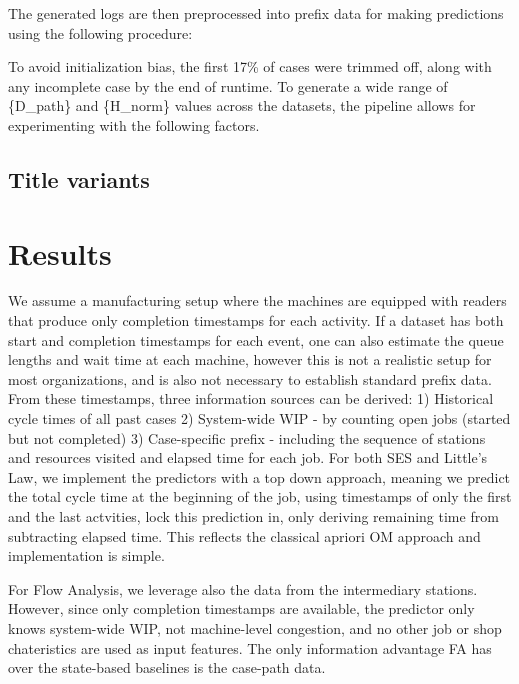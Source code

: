 \documentclass[
]{ceurart}
\begin{document}
The generated logs are then preprocessed into prefix data for making predictions using the following procedure:

To avoid initialization bias, the first 17\% of cases were trimmed off, along with any incomplete case by the end of runtime. 
To generate a wide range of \{D\_path\} and \{H\_norm\} values across the datasets, the pipeline allows for experimenting with the following factors.




\subsection{Title variants}

\section{Results}

We assume a manufacturing setup where the machines are equipped with readers that produce only completion timestamps for each activity. If a dataset has both start and completion 
timestamps for each event, one can also estimate the queue lengths and wait time at each machine, however this is not a realistic setup for most organizations, and is also not necessary to establish standard prefix data.
From these timestamps, three information sources can be derived:
1) Historical cycle times of all past cases
2) System-wide WIP - by counting open jobs (started but not completed)
3) Case-specific prefix - including the sequence of stations and resources visited and elapsed time for each job.
For both SES and Little's Law, we implement the predictors with a top down approach, meaning we predict the total cycle time at the beginning of the job, 
using timestamps of only the first and the last actvities, lock this prediction in, only deriving remaining time from subtracting elapsed time. This reflects the classical apriori OM approach and implementation is simple.

For Flow Analysis, we leverage also the data from the intermediary stations. However, since only completion timestamps are available, the predictor only knows system-wide WIP, not machine-level congestion, and no other job 
or shop chateristics are used as input features. The only information advantage FA has over the state-based baselines is the case-path data. 
\end{document}
